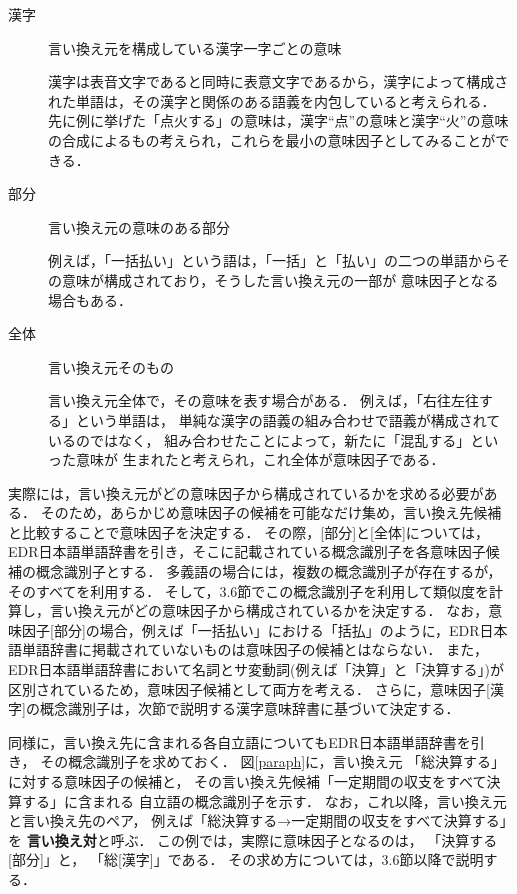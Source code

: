 \begin{description}
 
 
 \item[漢字] 言い換え元を構成している漢字一字ごとの意味

	    漢字は表音文字であると同時に表意文字であるから，漢字によって構成された単語は，その漢字と関係のある語義を内包していると考えられる．
	    先に例に挙げた「点火する」の意味は，漢字``点''の意味と漢字``火''の意味
	    の合成によるもの考えられ，これらを最小の意味因子としてみることができる．
 
 \item[部分] 言い換え元の意味のある部分
	    
	    例えば，「一括払い」という語は，「一括」と「払い」の二つの単語からその意味が構成されており，そうした言い換え元の一部が
意味因子となる場合もある．
 
 \item[全体] 言い換え元そのもの
		  
	    言い換え元全体で，その意味を表す場合がある．
	    例えば，「右往左往する」という単語は，
	    単純な漢字の語義の組み合わせで語義が構成されているのではなく，
	    組み合わせたことによって，新たに「混乱する」といった意味が
	    生まれたと考えられ，これ全体が意味因子である．
\end{description}
実際には，言い換え元がどの意味因子から構成されているかを求める必要がある．
そのため，あらかじめ意味因子の候補を可能なだけ集め，言い換え先候補と比較することで意味因子を決定する．
その際，[部分]と[全体]については，
EDR日本語単語辞書\cite{edrdic}を引き，そこに記載されている概念識別子を各意味因子候補の概念識別子とする．
多義語の場合には，複数の概念識別子が存在するが，そのすべてを利用する．
そして，3.6節でこの概念識別子を利用して類似度を計算し，言い換え元がどの意味因子から構成されているかを決定する．
なお，意味因子[部分]の場合，例えば「一括払い」における「括払」のように，EDR日本語単語辞書に掲載されていないものは意味因子の候補とはならない．
また，EDR日本語単語辞書において名詞とサ変動詞(例えば「決算」と「決算する」)が区別されているため，意味因子候補として両方を考える．
さらに，意味因子[漢字]の概念識別子は，次節で説明する漢字意味辞書に基づいて決定する．
		  
同様に，言い換え先に含まれる各自立語についてもEDR日本語単語辞書を引き，
その概念識別子を求めておく．
図\ref{paraph}に，言い換え元
「総決算する」に対する意味因子の候補と，
その言い換え先候補「一定期間の収支をすべて決算する」に含まれる
自立語の概念識別子を示す．
なお，これ以降，言い換え元と言い換え先のペア，
例えば「総決算する→一定期間の収支をすべて決算する」を
{\bf 言い換え対}と呼ぶ．
この例では，実際に意味因子となるのは，
「決算する[部分]」と，
「総[漢字]」である．
その求め方については，3.6節以降で説明する．


